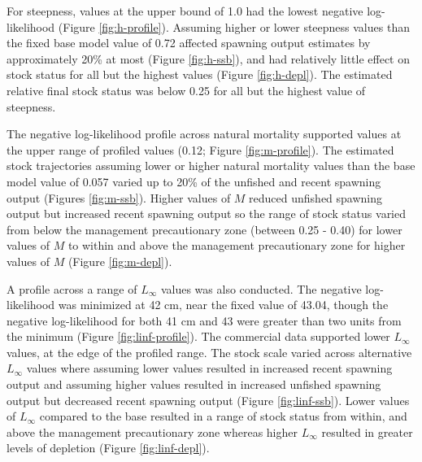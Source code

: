 \documentclass[11pt,
  english,
  a4paper,
]{article}
\begin{document}
For steepness, values at the upper bound of 1.0 had the lowest negative log-likelihood (Figure \ref{fig:h-profile}). Assuming higher or lower steepness values than the fixed base model value of 0.72 affected spawning output estimates by approximately 20\% at most (Figure \ref{fig:h-ssb}), and had relatively little effect on stock status for all but the highest values (Figure \ref{fig:h-depl}). The estimated relative final stock status was below 0.25 for all but the highest value of steepness.

\leavevmode\tagmcend\tagstructend\par


The negative log-likelihood profile across natural mortality supported values at the upper range of profiled values (0.12; Figure \ref{fig:m-profile}). The estimated stock trajectories assuming lower or higher natural mortality values than the base model value of 0.057 varied up to 20\% of the unfished and recent spawning output (Figures \ref{fig:m-ssb}). Higher values of {\(M\)\leavevmode\tagmcend\tagstructend} reduced unfished spawning output but increased recent spawning output so the range of stock status varied from below the management precautionary zone (between 0.25 - 0.40) for lower values of {\(M\)\leavevmode\tagmcend\tagstructend} to within and above the management precautionary zone for higher values of {\(M\)\leavevmode\tagmcend\tagstructend} (Figure \ref{fig:m-depl}).

\leavevmode\tagmcend\tagstructend\par


A profile across a range of {\(L_{\infty}\)\leavevmode\tagmcend\tagstructend} values was also conducted. The negative log-likelihood was minimized at 42 cm, near the fixed value of 43.04, though the negative log-likelihood for both 41 cm and 43 were greater than two units from the minimum (Figure \ref{fig:linf-profile}). The commercial data supported lower {\(L_{\infty}\)\leavevmode\tagmcend\tagstructend} values, at the edge of the profiled range. The stock scale varied across alternative {\(L_{\infty}\)\leavevmode\tagmcend\tagstructend} values where assuming lower values resulted in increased recent spawning output and assuming higher values resulted in increased unfished spawning output but decreased recent spawning output (Figure \ref{fig:linf-ssb}). Lower values of {\(L_{\infty}\)\leavevmode\tagmcend\tagstructend} compared to the base resulted in a range of stock status from within, and above the management precautionary zone whereas higher {\(L_{\infty}\)\leavevmode\tagmcend\tagstructend} resulted in greater levels of depletion (Figure \ref{fig:linf-depl}).
\end{document}
